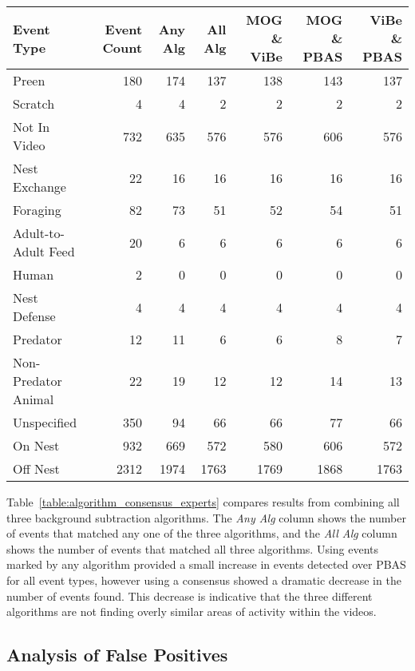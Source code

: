 \begin{sidewaystable}
\centering
\caption{Algorithm Accuracy with Consensus vs Expert Scientists on Tern and Plover Nests}
\label{table:algorithm_consensus_experts}
\begin{tabular}{lrrrrrr}
    \toprule
    Event Type & Event Count & Any Alg & All Alg & MOG \& ViBe & MOG \& PBAS & ViBe \& PBAS\\
    \midrule
    Preen & 180 & 174 & 137 & 138 & 143 & 137\\
    Scratch & 4 & 4 & 2 & 2 & 2 & 2\\
    Not In Video & 732 & 635 & 576 & 576 & 606 & 576\\
    Nest Exchange & 22 & 16 & 16 & 16 & 16 & 16\\
    Foraging & 82 & 73 & 51 & 52 & 54 & 51\\
    Adult-to-Adult Feed & 20 & 6 & 6 & 6 & 6 & 6\\
    Human & 2 & 0 & 0 & 0 & 0 & 0\\
    Nest Defense & 4 & 4 & 4 & 4 & 4 & 4\\
    Predator & 12 & 11 & 6 & 6 & 8 & 7\\
    Non-Predator Animal & 22 & 19 & 12 & 12 & 14 & 13\\
    Unspecified & 350 & 94 & 66 & 66 & 77 & 66\\
    On Nest & 932 & 669 & 572 & 580 & 606 & 572\\
    Off Nest & 2312 & 1974 & 1763 & 1769 & 1868 & 1763\\
    \bottomrule
\end{tabular}
\end{sidewaystable}

Table~\ref{table:algorithm_consensus_experts} compares results from combining all three background subtraction algorithms. The \emph{Any Alg} column shows the number of events that matched any one of the three algorithms, and the \emph{All Alg} column shows the number of events that matched all three algorithms. Using events marked by any algorithm provided a small increase in events detected over PBAS for all event types, however using a consensus showed a dramatic decrease in the number of events found. This decrease is indicative that the three different algorithms are not finding overly similar areas of activity within the videos.


\subsection{Analysis of False Positives}
\label{sec:false_positives}

